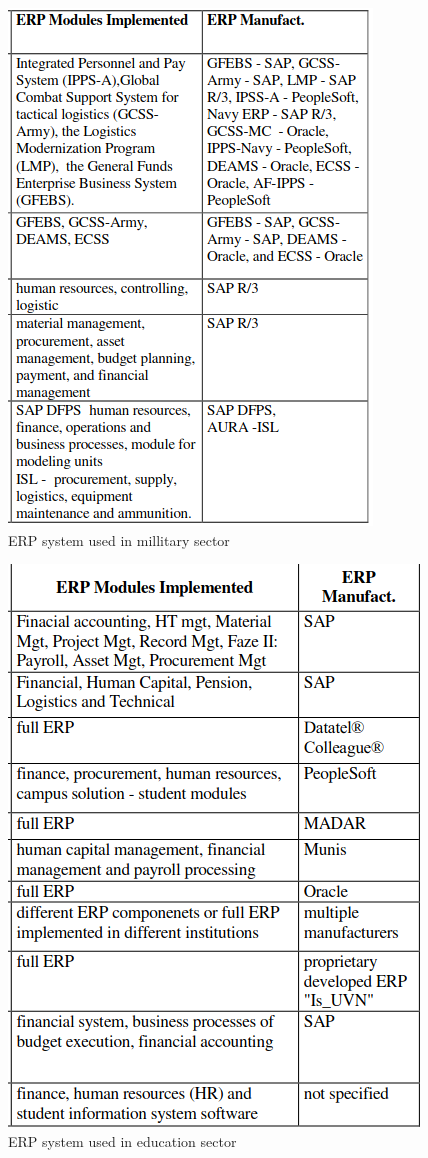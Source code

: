 \begin{figure}[htb]
\centering
	\includegraphics[scale=0.5]{Chapter1/Figures/ERP3.png}	
	\caption{ERP system used in millitary sector} 
	\label{fig:ERPmillitary}
\end{figure}

\begin{figure}[htb]
\centering
	\includegraphics[scale=0.5]{Chapter1/Figures/ERP1.png}	
	\caption{ERP system used in education sector}
	\label{fig:ERPEducation}
\end{figure}

